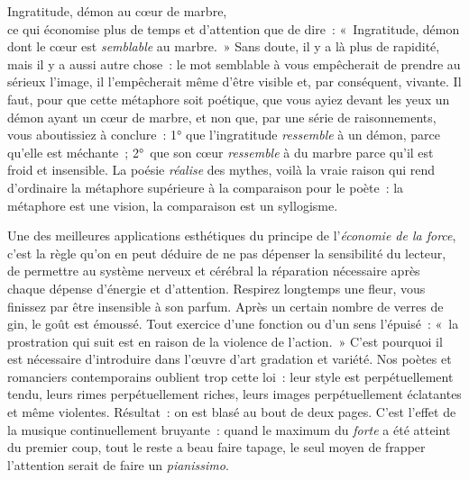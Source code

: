 \documentclass[french,twoside]{book} %
\begin{document}
Ingratitude, démon au cœur de marbre,\\

\noindent ce qui économise plus de temps et d’attention que de dire : « Ingratitude, démon dont le cœur est \emph{semblable} au marbre. » Sans doute, il y a là plus de rapidité, mais il y a aussi autre chose : le mot semblable à vous empêcherait de prendre au sérieux l’image, il l’empêcherait même d’être visible et, par conséquent, vivante. Il faut, pour que cette métaphore soit poétique, que vous ayiez devant les yeux un démon ayant un cœur de marbre, et non que, par une série de raisonnements, vous aboutissiez à conclure : 1° que l’ingratitude \emph{ressemble} à un démon, parce qu’elle est méchante ; 2° que son cœur \emph{ressemble} à du marbre parce qu’il est froid et insensible. La poésie \emph{réalise} des mythes, voilà la vraie raison qui rend d’ordinaire la métaphore supérieure à la comparaison pour le poète : la métaphore est une vision, la comparaison est un syllogisme.\par
Une des meilleures applications esthétiques du principe de l’\emph{économie de la force}, c’est la règle qu’on en peut déduire de ne pas dépenser la sensibilité du lecteur, de permettre au système nerveux et cérébral la réparation nécessaire après chaque dépense d’énergie et d’attention. Respirez longtemps une fleur, vous finissez par être insensible à son parfum. Après un certain nombre de verres de gin, le goût est émoussé. Tout exercice d’une fonction ou d’un sens l’épuisé : « la prostration qui suit est en raison de la violence de l’action. » C’est pourquoi il est nécessaire d’introduire dans l’œuvre d’art gradation et variété. Nos poètes et romanciers contemporains oublient trop cette loi : leur style est perpétuellement tendu, leurs rimes perpétuellement riches, leurs images perpétuellement éclatantes et même violentes. Résultat : on est blasé au bout de deux pages. C’est l’effet de la musique continuellement bruyante : quand le maximum du \emph{forte} a été atteint du premier coup, tout le reste a beau faire tapage, le seul moyen de frapper l’attention serait de faire un \emph{pianissimo}.\par
\end{document}
